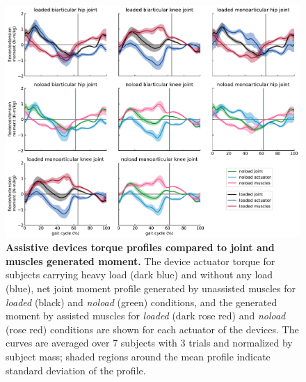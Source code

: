 \documentclass[10pt,letterpaper]{article}
\begin{document}
\begin{figure}[ht]   
	\centering
	\includegraphics[width=\linewidth]{Ideal_Exo_MonovsBi_Figures/PaperFigure_Exoskeletons_Torque.pdf}
	\vspace{1mm}
	\caption{{\small\textbf{Assistive devices torque profiles compared to joint and muscles generated moment.} The device actuator torque for subjects carrying heavy load (dark blue) and without any load (blue), net joint moment profile generated by unassisted muscles for \textit{loaded} (black) and \textit{noload} (green) conditions, and the generated moment by assisted muscles for \textit{loaded} (dark rose red) and \textit{noload} (rose red) conditions are shown for each actuator of the devices. The curves are averaged over 7 subjects with 3 trials and normalized by subject mass; shaded regions around the mean profile indicate standard deviation of the profile.}}
	\label{Fig_IdealExo_Torque}
\end{figure}
\end{document}
